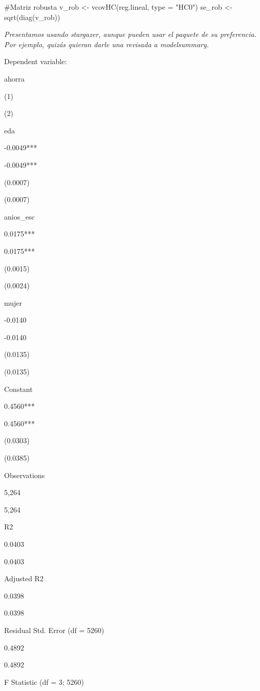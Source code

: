 \documentclass[
  letterpaper,
  DIV=11,
  numbers=noendperiod]{scrartcl}
\newenvironment{Shaded}{\begin{snugshade}}{\end{snugshade}}
\newcommand{\AttributeTok}[1]{\textcolor[rgb]{0.40,0.45,0.13}{#1}}
\newcommand{\CommentTok}[1]{\textcolor[rgb]{0.37,0.37,0.37}{#1}}
\newcommand{\FunctionTok}[1]{\textcolor[rgb]{0.28,0.35,0.67}{#1}}
\newcommand{\NormalTok}[1]{\textcolor[rgb]{0.00,0.23,0.31}{#1}}
\newcommand{\OtherTok}[1]{\textcolor[rgb]{0.00,0.23,0.31}{#1}}
\newcommand{\StringTok}[1]{\textcolor[rgb]{0.13,0.47,0.30}{#1}}
\begin{document}
\begin{Shaded}
\begin{Highlighting}[]
\CommentTok{\#Matriz robusta}
\NormalTok{v\_rob }\OtherTok{\textless{}{-}} \FunctionTok{vcovHC}\NormalTok{(reg.lineal, }\AttributeTok{type =} \StringTok{"HC0"}\NormalTok{)}
\NormalTok{se\_rob    }\OtherTok{\textless{}{-}} \FunctionTok{sqrt}\NormalTok{(}\FunctionTok{diag}\NormalTok{(v\_rob))}
\end{Highlighting}
\end{Shaded}

\emph{Presentamos usando stargazer, aunque pueden usar el paquete de su
preferencia. Por ejemplo, quizás quieran darle una revisada a
modelsummary.}

Dependent variable:

ahorra

(1)

(2)

eda

-0.0049***

-0.0049***

(0.0007)

(0.0007)

anios\_esc

0.0175***

0.0175***

(0.0015)

(0.0024)

mujer

-0.0140

-0.0140

(0.0135)

(0.0135)

Constant

0.4560***

0.4560***

(0.0303)

(0.0385)

Observations

5,264

5,264

R2

0.0403

0.0403

Adjusted R2

0.0398

0.0398

Residual Std. Error (df = 5260)

0.4892

0.4892

F Statistic (df = 3; 5260)
\end{document}
